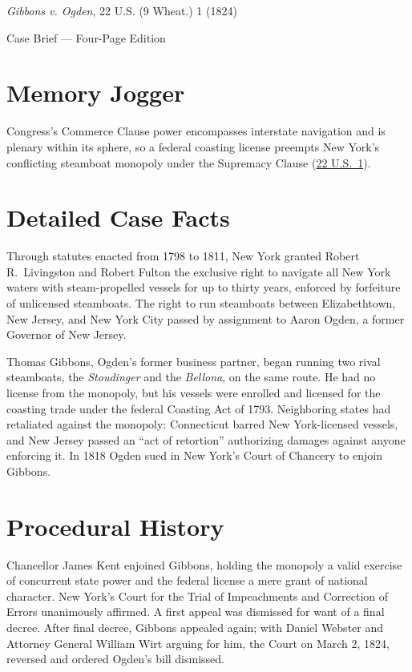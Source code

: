 \documentclass[12pt]{article}
\begin{document}
\begin{center}
{\LARGE \textit{Gibbons v. Ogden}, 22 U.S. (9 Wheat.) 1 (1824)\par}
\vspace{0.8em}
{\large Case Brief --- Four-Page Edition\par}
\end{center}
\vspace{1em}

\section{Memory Jogger}

Congress's Commerce Clause power encompasses interstate navigation and is plenary within its sphere, so a federal coasting license preempts New York's conflicting steamboat monopoly under the Supremacy Clause (\href{https://www.courtlistener.com/opinion/85412/gibbons-v-ogden/}{22 U.S.\ 1}).

\section{Detailed Case Facts}

Through statutes enacted from 1798 to 1811, New York granted Robert R.\ Livingston and Robert Fulton the exclusive right to navigate all New York waters with steam-propelled vessels for up to thirty years, enforced by forfeiture of unlicensed steamboats. The right to run steamboats between Elizabethtown, New Jersey, and New York City passed by assignment to Aaron Ogden, a former Governor of New Jersey.

Thomas Gibbons, Ogden's former business partner, began running two rival steamboats, the \textit{Stoudinger} and the \textit{Bellona}, on the same route. He had no license from the monopoly, but his vessels were enrolled and licensed for the coasting trade under the federal Coasting Act of 1793. Neighboring states had retaliated against the monopoly: Connecticut barred New York-licensed vessels, and New Jersey passed an ``act of retortion'' authorizing damages against anyone enforcing it. In 1818 Ogden sued in New York's Court of Chancery to enjoin Gibbons.

\section{Procedural History}

Chancellor James Kent enjoined Gibbons, holding the monopoly a valid exercise of concurrent state power and the federal license a mere grant of national character. New York's Court for the Trial of Impeachments and Correction of Errors unanimously affirmed. A first appeal was dismissed for want of a final decree. After final decree, Gibbons appealed again; with Daniel Webster and Attorney General William Wirt arguing for him, the Court on March 2, 1824, reversed and ordered Ogden's bill dismissed.
\end{document}
